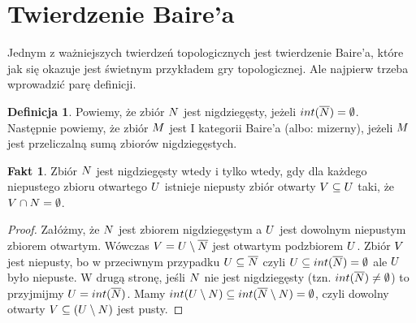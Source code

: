 \documentclass[12pt, a4paper, 2.5cm]{article}
\theoremstyle{definition}
\newtheorem{definition}{Definicja}
\newtheorem{fact}{Fakt}
\begin{document}
	\section{Twierdzenie Baire'a}
	Jednym z ważniejszych twierdzeń topologicznych jest twierdzenie Baire'a, które jak się okazuje jest świetnym przykładem gry topologicznej. Ale najpierw trzeba wprowadzić parę definicji.
	\begin{definition}
		Powiemy, że zbiór $\mathnormal{N}$ jest nigdziegęsty, jeżeli $int(\mathnormal{\overline{N}})=\emptyset$.\\
		Następnie powiemy, że zbiór $\mathnormal{M}$ jest I kategorii Baire'a (albo: mizerny), jeżeli $\mathnormal{M}$ jest przeliczalną sumą zbiorów nigdziegęstych.
	\end{definition}
	\begin{fact}
		Zbiór $\mathnormal{N}$ jest nigdziegęsty wtedy i tylko wtedy, gdy dla każdego niepustego zbioru otwartego $\mathnormal{U}$ istnieje niepusty zbiór otwarty $\mathnormal{V}\subseteq\mathnormal{U}$ taki, że $\mathnormal{V}\cap\mathnormal{N}=\emptyset$.
	\end{fact}
	\begin{proof}
		Załóżmy, że $\mathnormal{N}$ jest zbiorem nigdziegęstym a $\mathnormal{U}$ jest dowolnym niepustym zbiorem otwartym. Wówczas $\mathnormal{V}=\mathnormal{U\setminus\mathnormal{\overline{N}}}$ jest otwartym podzbiorem $\mathnormal{U}$. Zbiór $\mathnormal{V}$ jest niepusty, bo w przeciwnym przypadku $\mathnormal{U}\subseteq\mathnormal{\overline{N}}$ czyli $\mathnormal{U}\subseteq int(\mathnormal{\overline{N}})=\emptyset$ ale $\mathnormal{U}$ było niepuste. W drugą stronę, jeśli $\mathnormal{N}$ nie jest nigdziegęsty (tzn. $int(\mathnormal{\overline{N}})\neq\emptyset$) to przyjmijmy $\mathnormal{U}=int(\mathnormal{\overline{N}})$. Mamy $int(\mathnormal{U}\setminus\mathnormal{N})\subseteq int(\mathnormal{\overline{N}}\setminus\mathnormal{N})=\emptyset$, czyli dowolny otwarty $\mathnormal{V}\subseteq(\mathnormal{U}\setminus\mathnormal{N})$ jest pusty.
	\end{proof}
\end{document}
